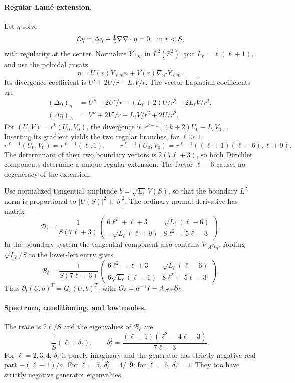 \paragraph{Regular Lam\'e extension.}
Let $\eta$ solve
\[
 \mathcal L\eta=\Delta\eta+\tfrac13\nabla\nabla\cdot\eta=0
 \quad\hbox{in }r<S,
\]
with regularity at the center. Normalize $Y_{\ell m}$ in $L^2(\mathbb S^2)$,
put $L_\ell=\ell(\ell+1)$, and use the poloidal ansatz
\[
 \eta=U(r)Y_{\ell m}n+V(r)\nabla_{\mathbb S^2}Y_{\ell m}.
\]
Its divergence coefficient is
$U'+2U/r-L_\ell V/r$. The vector Laplacian coefficients are
\begin{align}
 (\Delta\eta)_n&=U''+2U'/r-(L_\ell+2)U/r^2+2L_\ell V/r^2,\\
 (\Delta\eta)_A&=V''+2V'/r-L_\ell V/r^2+2U/r^2.
\end{align}
For $(U,V)=r^k(U_0,V_0)$, the divergence is
$r^{k-1}[(k+2)U_0-L_\ell V_0]$. Inserting its gradient yields the two
regular branches, for $\ell\ge1$,
\[
 r^{\ell-1}(U_0,V_0)=r^{\ell-1}(\ell,1),\qquad
 r^{\ell+1}(U_0,V_0)=
 r^{\ell+1}((\ell+1)(\ell-6),\ell+9).
\]
The determinant of their two boundary vectors is $2(7\ell+3)$, so both
Dirichlet components determine a unique regular extension. The factor
$\ell-6$ causes no degeneracy of the extension.

Use normalized tangential amplitude $b=\sqrt{L_\ell}\,V(S)$, so that the
boundary $L^2$ norm is proportional to $|U(S)|^2+|b|^2$.
The ordinary normal derivative has matrix
\[
 \mathcal D_\ell=\frac1{S(7\ell+3)}
 \begin{pmatrix}
 6\ell^2+\ell+3&\sqrt{L_\ell}(\ell-6)\\
 -\sqrt{L_\ell}(\ell+9)&8\ell^2+5\ell-3
 \end{pmatrix}.
\]
In the boundary system the tangential component also contains
$\nabla_A\eta_n$. Adding $\sqrt{L_\ell}/S$ to the lower-left entry gives
\begin{equation}
 \mathcal B_\ell=\frac1{S(7\ell+3)}
 \begin{pmatrix}
 6\ell^2+\ell+3&\sqrt{L_\ell}(\ell-6)\\
 6\sqrt{L_\ell}(\ell-1)&8\ell^2+5\ell-3
 \end{pmatrix}.
 \label{eq:ball-poloidal-B}
\end{equation}
Thus $\partial_t(U,b)^T=G_\ell(U,b)^T$, with
$G_\ell=a^{-1}I-A_{\mathscr I^+}\mathcal B_\ell$.

\paragraph{Spectrum, conditioning, and low modes.}
The trace is $2\ell/S$ and the eigenvalues of $\mathcal B_\ell$ are
\[
 \frac1S(\ell\pm\delta_\ell),\qquad
 \delta_\ell^2=
 \frac{(\ell-1)(\ell^2-4\ell-3)}{7\ell+3}.
\]
For $\ell=2,3,4$, $\delta_\ell$ is purely imaginary and the generator
has strictly negative real part $-(\ell-1)/a$. For $\ell=5$,
$\delta_\ell^2=4/19$; for $\ell=6$, $\delta_\ell^2=1$.
They too have strictly negative generator eigenvalues.


